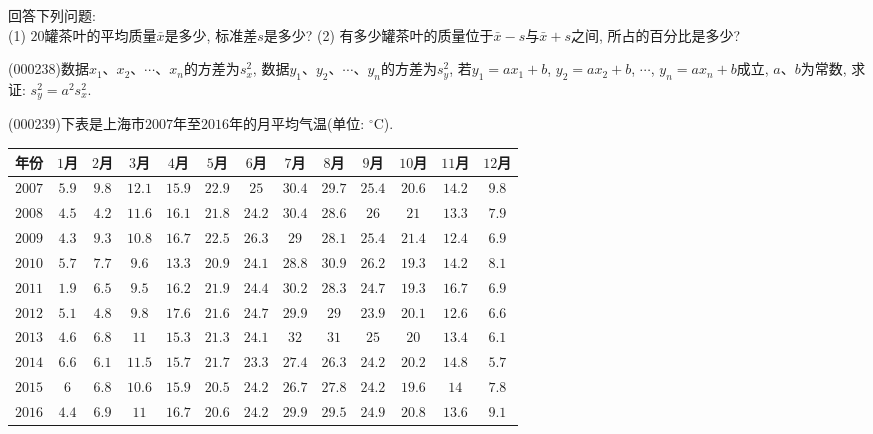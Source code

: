 回答下列问题:\\
(1) $20$罐茶叶的平均质量$\bar{x}$是多少, 标准差$s$是多少?
(2) 有多少罐茶叶的质量位于$\bar x-s$与$\bar x +s$之间, 所占的百分比是多少?
\item (000238)数据$x_1$、$x_2$、$\cdots$、$x_n$的方差为$s_x^2$, 数据$y_1$、$y_2$、$\cdots$、$y_n$的方差为$s_y^2$, 若$y_1=ax_1+b$, $y_2=ax_2+b$, $\cdots$, $y_n=ax_n+b$成立, $a$、$b$为常数, 求证: $s_y^2=a^2s_x^2$.
\item (000239)下表是上海市$2007$年至$2016$年的月平均气温(单位: $^\circ\text{C}$).
\begin{center}
    \begin{tabular}{|c|c|c|c|c|c|c|c|c|c|c|c|c|}
        \hline
        年份 & $1$月 & $2$月 & $3$月 & $4$月 & $5$月 & $6$月 & $7$月 & $8$月 & $9$月 & $10$月 & $11$月 & $12$月 \\ \hline
        $2007$ & $5.9$ & $9.8$ & $12.1$ & $15.9$ & $22.9$ & $25$ & $30.4$ & $29.7$ & $25.4$ & $20.6$ & $14.2$ & $9.8$ \\ \hline
        $2008$ & $4.5$ & $4.2$ & $11.6$ & $16.1$ & $21.8$ & $24.2$ & $30.4$ & $28.6$ & $26$ & $21$ & $13.3$ & $7.9$ \\ \hline
        $2009$ & $4.3$ & $9.3$ & $10.8$ & $16.7$ & $22.5$ & $26.3$ & $29$ & $28.1$ & $25.4$ & $21.4$ & $12.4$ & $6.9$ \\ \hline
        $2010$ & $5.7$ & $7.7$ & $9.6$ & $13.3$ & $20.9$ & $24.1$ & $28.8$ & $30.9$ & $26.2$ & $19.3$ & $14.2$ & $8.1$\\ \hline
        $2011$ & $1.9$ & $6.5$ & $9.5$ & $16.2$ & $21.9$ & $24.4$ & $30.2$ & $28.3$ & $24.7$ & $19.3$ & $16.7$ & $6.9$\\ \hline
        $2012$ & $5.1$ & $4.8$ & $9.8$ & $17.6$ & $21.6$ & $24.7$ & $29.9$ & $29$ & $23.9$ & $20.1$ & $12.6$ & $6.6$\\ \hline
        $2013$ & $4.6$ & $6.8$ & $11$ & $15.3$ & $21.3$ & $24.1$ & $32$ &  $31$ & $25$ & $20$ & $13.4$ & $6.1$\\ \hline
        $2014$ & $6.6$ & $6.1$ & $11.5$ & $15.7$ & $21.7$ & $23.3$ & $27.4$ & $26.3$ & $24.2$ & $20.2$ & $14.8$ & $5.7$\\ \hline
        $2015$ & $6$ & $6.8$ & $10.6$ & $15.9$ & $20.5$ & $24.2$ & $26.7$ & $27.8$ & $24.2$ & $19.6$ & $14$ & $7.8$\\ \hline
        $2016$ & $4.4$ & $6.9$ & $11$ & $16.7$ & $20.6$ & $24.2$ & $29.9$ & $29.5$ & $24.9$ & $20.8$ & $13.6$ & $9.1$\\ \hline
    \end{tabular}
\end{center}
